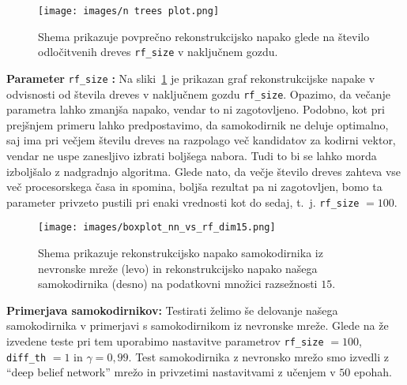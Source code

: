 \documentclass[12pt,a4paper,twoside]{article}
\theoremstyle{definition} %
\theoremstyle{plain} %
\numberwithin{equation}{section}  %
\begin{document}

\begin{figure}[h]
	\centering
	\texttt{[image: images/n trees plot.png]}
	\caption[Graf natančnosti glede na \texttt{rf\_size}]{Shema prikazuje povprečno rekonstrukcijsko napako glede na število odločitvenih dreves \texttt{rf\_size} v naključnem gozdu.}
	\label{fig:n_trees}
\end{figure}


\textbf{Parameter} \texttt{rf\_size} \textbf{:} Na sliki~\ref{fig:n_trees} je prikazan graf rekonstrukcijske napake v odvisnosti od števila dreves v naključnem gozdu \texttt{rf\_size}.
Opazimo, da večanje parametra lahko zmanjša napako, vendar to ni zagotovljeno.
Podobno, kot pri prejšnjem primeru lahko predpostavimo, da samokodirnik ne deluje optimalno, saj ima pri večjem številu dreves na razpolago več kandidatov za kodirni vektor, vendar ne uspe zanesljivo izbrati boljšega nabora.
Tudi to bi se lahko morda izboljšalo z nadgradnjo algoritma.
Glede nato, da večje število dreves zahteva vse več procesorskega časa in spomina, boljša rezultat pa ni zagotovljen, bomo ta parameter privzeto pustili pri enaki vrednosti kot do sedaj, t.~j. \texttt{rf\_size} $=100$.



\begin{figure}[h]
	\centering
	\texttt{[image: images/boxplot\_nn\_vs\_rf\_dim15.png]}
	\caption[Graf za primerjavo samokodirnikov]{Shema prikazuje rekonstrukcijsko napako samokodirnika 
	iz nevronske mreže (levo) in rekonstrukcijsko napako našega samokodirnika (desno) na podatkovni množici razsežnosti $15$.}
	\label{fig:boxplot_nn_vs_rf_15}
\end{figure}

\textbf{Primerjava samokodirnikov:} Testirati želimo še delovanje našega samokodirnika v primerjavi s samokodirnikom iz nevronske mreže.
Glede na že izvedene teste pri tem uporabimo nastavitve parametrov \texttt{rf\_size} $=100$, \texttt{diff\_th} $=1$ in $\gamma=0,99$.
Test samokodirnika z nevronsko mrežo smo izvedli z ``deep belief network'' mrežo in privzetimi nastavitvami z učenjem v $50$ epohah.
\end{document}
